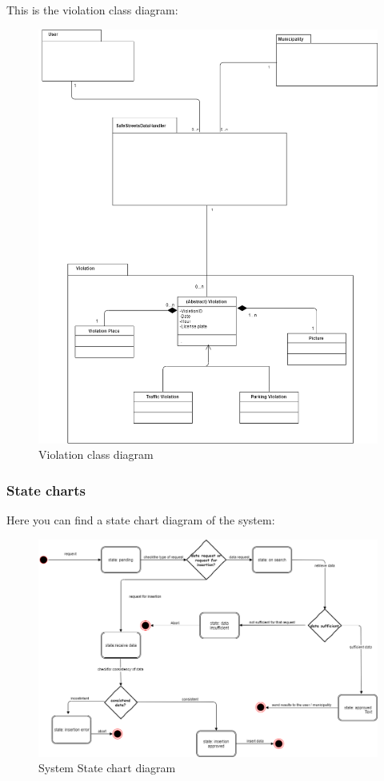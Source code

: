 \documentclass[titlepage]{article}
\begin{document}
\newpage
This is the violation class diagram:
\begin{figure}[h
]
	\includegraphics[scale=0.35]{UML violation v1.1.png}
	\centering
	\caption{Violation class diagram}
\end{figure}
\FloatBarrier

\newpage
\subsubsection{State charts }
Here you can find a state chart diagram of the system:

\begin{figure}[h
]
    \includegraphics[scale=0.45]{State_chart.png}
	\centering
	\caption{System State chart diagram}
\end{figure}
\FloatBarrier
\end{document}
